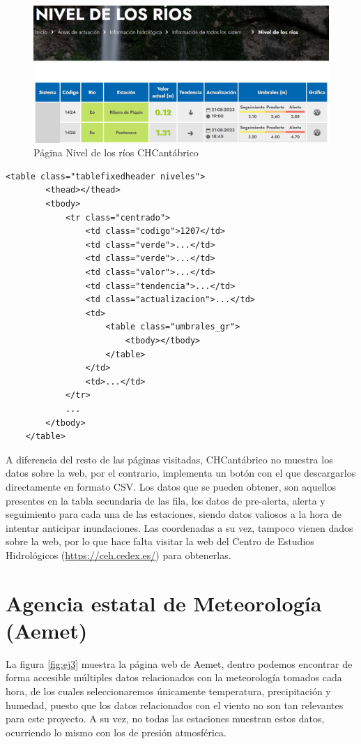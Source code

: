 \begin{figure} [H]
	\centering
	\includegraphics[width=.7\linewidth]{fig/CHCantabricoCode.png}
	\caption{Página Nivel de los ríos CHCantábrico}
	\label{fig:ej30}
\end{figure}

\begin{lstlisting}[basicstyle=\footnotesize, caption={HTML tabla estaciones en CHCantábrico}, label=cod:104]
	<table class="tablefixedheader niveles">
		<thead></thead>
		<tbody>
			<tr class="centrado">
				<td class="codigo">1207</td>
				<td class="verde">...</td>
				<td class="verde">...</td>
				<td class="valor">...</td>
				<td class="tendencia">...</td>
				<td class="actualizacion">...</td>
				<td>
					<table class="umbrales_gr">											
						<tbody></tbody>
					</table>
				</td>
				<td>...</td>	
			</tr>
			...
		</tbody>
	</table>
\end{lstlisting}

A diferencia del resto de las páginas visitadas, CHCantábrico no muestra los datos sobre la web, por el contrario, implementa un botón con el que descargarlos directamente en formato CSV. Los datos que se pueden obtener, son aquellos presentes en la tabla secundaria de las fila, los datos de pre-alerta, alerta y seguimiento para cada una de las estaciones, siendo datos valiosos a la hora de intentar anticipar inundaciones. Las coordenadas a su vez, tampoco vienen dados sobre la web, por lo que hace falta visitar la web del Centro de Estudios Hidrológicos (\url{https://ceh.cedex.es/}) para obtenerlas.

\section{Agencia estatal de Meteorología (Aemet)}
La figura \ref{fig:ej3} muestra la página web de Aemet, dentro podemos encontrar de forma accesible múltiples datos relacionados con la meteorología tomados cada hora, de los cuales seleccionaremos únicamente temperatura, precipitación y humedad, puesto que los datos relacionados con el viento no son tan relevantes para este proyecto. A su vez, no todas las estaciones muestran estos datos, ocurriendo lo mismo con los de presión atmosférica.

